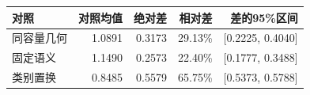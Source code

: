 \begin{tabular}{lrrrr}
\toprule
对照 & 对照均值 & 绝对差 & 相对差 & 差的95\%区间\\\midrule
同容量几何 & 1.0891 & 0.3173 & 29.13\% & [0.2225, 0.4040] \\
固定语义 & 1.1490 & 0.2573 & 22.40\% & [0.1777, 0.3488] \\
类别置换 & 0.8485 & 0.5579 & 65.75\% & [0.5373, 0.5788] \\
\bottomrule
\end{tabular}
